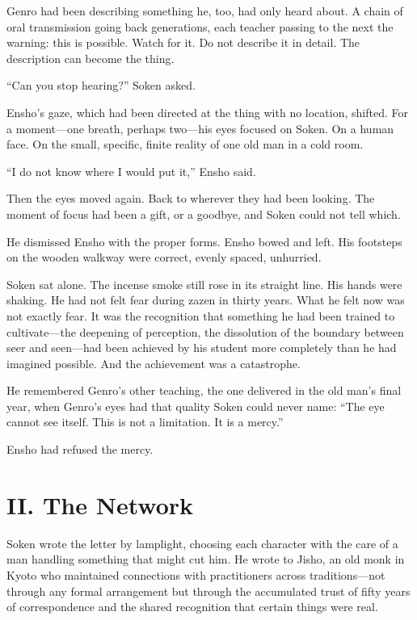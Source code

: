 Genro had been describing something he, too, had only heard about. A chain of oral transmission going back generations, each teacher passing to the next the warning: this is possible. Watch for it. Do not describe it in detail. The description can become the thing.

``Can you stop hearing?'' Soken asked.

Ensho's gaze, which had been directed at the thing with no location, shifted. For a moment---one breath, perhaps two---his eyes focused on Soken. On a human face. On the small, specific, finite reality of one old man in a cold room.

``I do not know where I would put it,'' Ensho said.

Then the eyes moved again. Back to wherever they had been looking. The moment of focus had been a gift, or a goodbye, and Soken could not tell which.

He dismissed Ensho with the proper forms. Ensho bowed and left. His footsteps on the wooden walkway were correct, evenly spaced, unhurried.

Soken sat alone. The incense smoke still rose in its straight line. His hands were shaking. He had not felt fear during zazen in thirty years. What he felt now was not exactly fear. It was the recognition that something he had been trained to cultivate---the deepening of perception, the dissolution of the boundary between seer and seen---had been achieved by his student more completely than he had imagined possible. And the achievement was a catastrophe.

He remembered Genro's other teaching, the one delivered in the old man's final year, when Genro's eyes had that quality Soken could never name: ``The eye cannot see itself. This is not a limitation. It is a mercy.''

Ensho had refused the mercy.


\section*{II. The Network}

Soken wrote the letter by lamplight, choosing each character with the care of a man handling something that might cut him. He wrote to Jisho, an old monk in Kyoto who maintained connections with practitioners across traditions---not through any formal arrangement but through the accumulated trust of fifty years of correspondence and the shared recognition that certain things were real.

